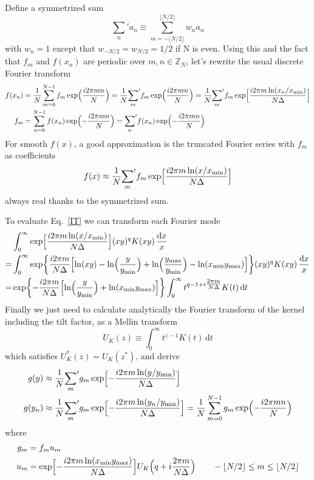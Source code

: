 \documentclass{article}
\renewcommand{\d}{\mathrm{d}}
\newcommand{\xmin}{x_\textrm{min}}
\newcommand{\ymin}{y_\textrm{min}}
\newcommand{\ymax}{y_\textrm{max}}
\newcommand{\Nhalf}{\lfloor N/2\rfloor}
\newcommand{\Mellin}{U}
\begin{document}
Define a symmetrized sum
\begin{equation}
    {\sum_n}' a_n \equiv \sum_{m=-\Nhalf}^{\Nhalf} w_n a_n
\end{equation}
with $w_n=1$ except that $w_{-N/2}=w_{N/2}=1/2$ if N is even.
Using this and the fact that $f_m$ and $f(x_n)$ are periodic over $m,n\in\mathbb{Z}_N$,
let's rewrite the usual discrete Fourier transform
\begin{align}
    f(x_n) &= \frac1N \sum_{m=0}^{N-1} f_m \exp\Bigl(\frac{i2\pi mn}N\Bigr)
    = \frac1N {\sum_m}' f_m \exp\Bigl(\frac{i2\pi mn}N\Bigr)
    = \frac1N {\sum_m}' f_m \exp\Bigl[\frac{i2\pi m\ln(x_n/\xmin)}{N\Delta}\Bigr]  \\
    \label{step1}
    f_m &= \sum_{n=0}^{N-1} f(x_n) \exp\Bigl(-\frac{i2\pi mn}N\Bigr)
    = {\sum_n}' f(x_n) \exp\Bigl(-\frac{i2\pi mn}N\Bigr)
\end{align}
For smooth $f(x)$, a good approximation is the truncated Fourier series
with $f_m$ as coefficients
\begin{equation}
    f(x) \approx \frac1N {\sum_m}' f_m \exp\Bigl[\frac{i2\pi m\ln(x/\xmin)}{N\Delta}\Bigr]
\end{equation}
always real thanks to the symmetrized sum.

To evaluate Eq.~\eqref{IT} we can transform each Fourier mode
\begin{align}
    &\int_0^\infty \exp\Bigl[\frac{i2\pi m\ln(x/\xmin)}{N\Delta}\Bigr]
        (xy)^q K(xy) \,\frac{\d x}x  \\
    = &\int_0^\infty \exp\biggl\{\frac{i2\pi m}{N\Delta}
        \Bigl[\ln(xy)-\ln\Bigl(\frac{y}{\ymin}\Bigr)
            +\ln\Bigl(\frac{\ymax}{\ymin}\Bigr)-\ln(\xmin\ymax)\Bigr]
    \biggr\} (xy)^q K(xy) \,\frac{\d x}x  \\
    = &\exp\biggl\{-\frac{i2\pi m}{N\Delta}
        \Bigl[\ln\Bigl(\frac{y}{\ymin}\Bigr)+\ln(\xmin\ymax)\Bigr]
    \biggr\} \int_0^\infty t^{q-1+i\tfrac{2\pi m}{N\Delta}} K(t) \,\d t
\end{align}
Finally we just need to calculate analytically
the Fourier transform of the kernel including the tilt factor,
as a Mellin transform
\begin{equation}
    \label{Mellin}
    \Mellin_K(z) \equiv \int_0^\infty t^{z-1} K(t) \,\d t
\end{equation}
which satisfies $\Mellin_K^*(z)=\Mellin_K(z^*)$, and derive
\begin{align}
    g(y) &\approx \frac1N {\sum_m}' g_m \exp\Bigl[-\frac{i2\pi m\ln(y/\ymin)}{N\Delta}\Bigr]  \\
    \label{step6}
    g(y_n) &\approx \frac1N {\sum_m}' g_m \exp\Bigl[-\frac{i2\pi m\ln(y_n/\ymin)}{N\Delta}\Bigr]
    = \frac1N \sum_{m=0}^{N-1} g_m \exp\Bigl(-\frac{i2\pi mn}N\Bigr)
\end{align}
where
\begin{align}
    \label{step5}
    g_m &= f_m u_m  \\
    \label{step4}
    u_m &= \exp\Bigl[-\frac{i2\pi m\ln(\xmin\ymax)}{N\Delta}\Bigr]
    \Mellin_K\Bigl(q+i\frac{2\pi m}{N\Delta}\Bigr) \qquad -\Nhalf\leq m\leq\Nhalf
\end{align}
\end{document}

